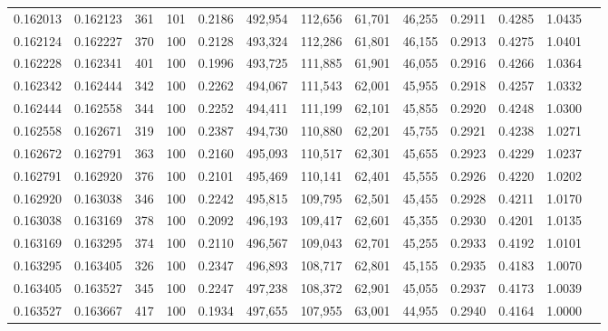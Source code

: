 \begin{tabular}{rrrrrrrrrrrrr}
0.162013 & 0.162123 &   361 & 101 &                                     0.2186 & 492,954 & 112,656 &  61,701 &  46,255 & 0.2911 & 0.4285 & 1.0435 \\
0.162124 & 0.162227 &   370 & 100 &                                     0.2128 & 493,324 & 112,286 &  61,801 &  46,155 & 0.2913 & 0.4275 & 1.0401 \\
0.162228 & 0.162341 &   401 & 100 &                                     0.1996 & 493,725 & 111,885 &  61,901 &  46,055 & 0.2916 & 0.4266 & 1.0364 \\
0.162342 & 0.162444 &   342 & 100 &                                     0.2262 & 494,067 & 111,543 &  62,001 &  45,955 & 0.2918 & 0.4257 & 1.0332 \\
0.162444 & 0.162558 &   344 & 100 &                                     0.2252 & 494,411 & 111,199 &  62,101 &  45,855 & 0.2920 & 0.4248 & 1.0300 \\
0.162558 & 0.162671 &   319 & 100 &                                     0.2387 & 494,730 & 110,880 &  62,201 &  45,755 & 0.2921 & 0.4238 & 1.0271 \\
0.162672 & 0.162791 &   363 & 100 &                                     0.2160 & 495,093 & 110,517 &  62,301 &  45,655 & 0.2923 & 0.4229 & 1.0237 \\
0.162791 & 0.162920 &   376 & 100 &                                     0.2101 & 495,469 & 110,141 &  62,401 &  45,555 & 0.2926 & 0.4220 & 1.0202 \\
0.162920 & 0.163038 &   346 & 100 &                                     0.2242 & 495,815 & 109,795 &  62,501 &  45,455 & 0.2928 & 0.4211 & 1.0170 \\
0.163038 & 0.163169 &   378 & 100 &                                     0.2092 & 496,193 & 109,417 &  62,601 &  45,355 & 0.2930 & 0.4201 & 1.0135 \\
0.163169 & 0.163295 &   374 & 100 &                                     0.2110 & 496,567 & 109,043 &  62,701 &  45,255 & 0.2933 & 0.4192 & 1.0101 \\
0.163295 & 0.163405 &   326 & 100 &                                     0.2347 & 496,893 & 108,717 &  62,801 &  45,155 & 0.2935 & 0.4183 & 1.0070 \\
0.163405 & 0.163527 &   345 & 100 &                                     0.2247 & 497,238 & 108,372 &  62,901 &  45,055 & 0.2937 & 0.4173 & 1.0039 \\
0.163527 & 0.163667 &   417 & 100 &                                     0.1934 & 497,655 & 107,955 &  63,001 &  44,955 & 0.2940 & 0.4164 & 1.0000 \\

\end{tabular}
